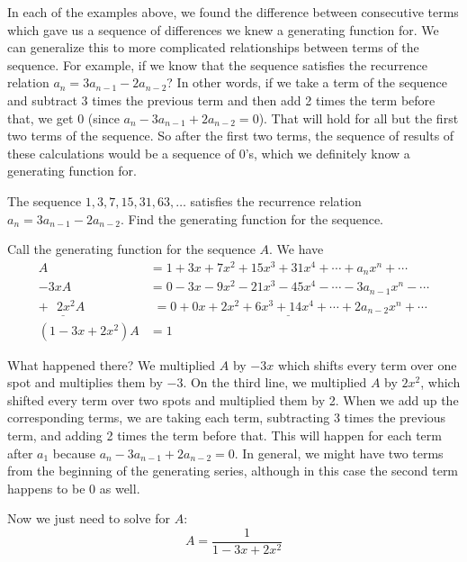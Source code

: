 \documentclass[12pt]{article}
\begin{document}
  
In each of the examples above, we found the difference between consecutive terms which gave us a sequence of differences we knew a generating function for.  We can generalize this to more complicated relationships between terms of the sequence.  For example, if we know that the sequence satisfies the recurrence relation $a_n = 3a_{n-1} - 2a_{n-2}$?  In other words, if we take a term of the sequence and subtract 3 times the previous term and then add 2 times the term before that, we get 0 (since $a_n - 3a_{n-1} + 2a_{n-2} = 0$).  That will hold for all but the first two terms of the sequence.  So after the first two terms, the sequence of results of these calculations would be a sequence of 0's, which we definitely know a generating function for.

\begin{example}
 The sequence $1, 3, 7, 15, 31, 63, \ldots$ satisfies the recurrence relation $a_n = 3a_{n-1} - 2a_{n-2}$.  Find the generating function for the sequence.
 
 \begin{solution}
  Call the generating function for the sequence $A$.  We have 
  \begin{align*}
   A & = 1 + 3x + 7x^2 + 15x^3 + 31x^4 + \cdots + a_nx^n + \cdots \\
   -3xA & = 0 - 3x - 9x^2 - 21x^3 - 45x^4 - \cdots - 3a_{n-1}x^n - \cdots \\
   \underline{+~~~2x^2A_{~}^{~}} & \underline{\,\, = 0 + 0x + 2x^2 + 6x^3 + 14x^4 + \cdots + 2a_{n-2}x^n + \cdots} \\
   (1-3x+2x^2)A & = 1
  \end{align*}
  
  
  What happened there?  We multiplied $A$ by $-3x$ which shifts every term over one spot and multiplies them by $-3$.  On the third line, we multiplied $A$ by $2x^2$, which shifted every term over two spots and multiplied them by 2.  When we add up the corresponding terms, we are taking each term, subtracting 3 times the previous term, and adding 2 times the term before that.  This will happen for each term after $a_1$ because $a_n - 3a_{n-1} + 2a_{n-2} = 0$.  In general, we might have two terms from the beginning of the generating series, although in this case the second term happens to be 0 as well.
  
  Now we just need to solve for $A$:
  \[A = \frac{1}{1 - 3x + 2x^2}\]
 \end{solution}

\end{example}
\end{document}
